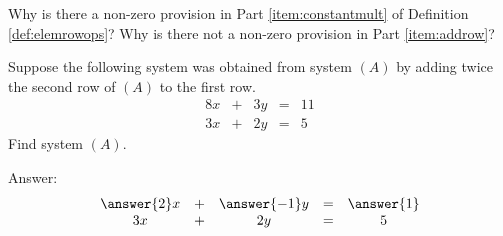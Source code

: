 \documentclass{ximera}
\begin{document}
\begin{problem}\label{prob:nonzeroprovision}
Why is there a non-zero provision in Part \ref{item:constantmult} of Definition \ref{def:elemrowops}?  Why is there not a non-zero provision in Part \ref{item:addrow}?
\end{problem}

\begin{problem}\label{prob:reverseelemrowops}
Suppose the following system was obtained from system $(A)$ by adding twice the second row of $(A)$ to the first row.
$$\begin{array}{ccccc}
      8x &+ &3y&= &11\\
      3x&+ &2y&=&5      
    \end{array}$$
    Find system $(A)$.
    
    Answer:
    $$\begin{array}{ccccc}
      \answer{2}x &+ &\answer{-1}y&= &\answer{1}\\
      3x&+ &2y&=&5      
    \end{array}$$
    
\end{problem}
\end{document}
